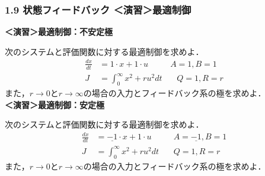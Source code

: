 \begin{frame}[t]
\frametitle{1.9 状態フィードバック ＜演習＞最適制御}



\noindent
{\bf ＜演習＞最適制御：不安定極} \nopagebreak

次のシステムと評価関数に対する最適制御を求めよ．
\begin{align*}
	\frac{dx}{dt} & = 1 \cdot x + 1 \cdot u \ \ \ \ \ \ \ \ \ \ \ \ A=1,B=1\\
	J & = \int_0^{\infty} x^2 + r u^2 dt \ \ \ \ \ \ \ \ Q=1,R=r
\end{align*}
また，$r\rightarrow 0$と$r\rightarrow \infty$の場合の入力とフィードバック系の極を求めよ．
\\[5mm]

\noindent
{\bf ＜演習＞最適制御：安定極} \nopagebreak

次のシステムと評価関数に対する最適制御を求めよ．
\begin{align*}
	\frac{dx}{dt} & = \underline{-1} \cdot x + 1 \cdot u \ \ \ \ \ \ \ \ \ \ \ \ A=\underline{-1},B=1\\
	J & = \int_0^{\infty} x^2 + r u^2 dt \ \ \ \ \ \ \ \ Q=1,R=r
\end{align*}
また，$r\rightarrow 0$と$r\rightarrow \infty$の場合の入力とフィードバック系の極を求めよ．

\end{frame}



